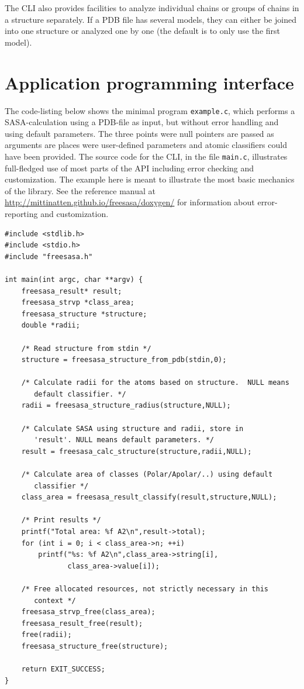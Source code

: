 \documentclass[a4paper,11pt]{article}
\begin{document}
The CLI also provides facilities to analyze individual chains or
groups of chains in a structure separately. If a PDB file has several
models, they can either be joined into one structure or analyzed one
by one (the default is to only use the first model).

\section{Application programming interface}\label{sec:api}

The code-listing below shows the minimal program \verb|example.c|,
which performs a SASA-calculation using a PDB-file as input, but
without error handling and using default parameters. The three points
were null pointers are passed as arguments are places were
user-defined parameters and atomic classifiers could have been
provided. The source code for the CLI, in the file \verb|main.c|,
illustrates full-fledged use of most parts of the API including error
checking and customization. The example here is meant to illustrate
the most basic mechanics of the library. See the reference manual at
\url{http://mittinatten.github.io/freesasa/doxygen/} for information
about error-reporting and customization.

\begin{verbatim}
#include <stdlib.h>
#include <stdio.h>
#include "freesasa.h"

int main(int argc, char **argv) {
    freesasa_result* result;
    freesasa_strvp *class_area;
    freesasa_structure *structure;
    double *radii;

    /* Read structure from stdin */
    structure = freesasa_structure_from_pdb(stdin,0);

    /* Calculate radii for the atoms based on structure.  NULL means
       default classifier. */
    radii = freesasa_structure_radius(structure,NULL);

    /* Calculate SASA using structure and radii, store in
       'result'. NULL means default parameters. */
    result = freesasa_calc_structure(structure,radii,NULL);
    
    /* Calculate area of classes (Polar/Apolar/..) using default
       classifier */
    class_area = freesasa_result_classify(result,structure,NULL);

    /* Print results */
    printf("Total area: %f A2\n",result->total);
    for (int i = 0; i < class_area->n; ++i)
        printf("%s: %f A2\n",class_area->string[i],
               class_area->value[i]);

    /* Free allocated resources, not strictly necessary in this
       context */
    freesasa_strvp_free(class_area);
    freesasa_result_free(result);
    free(radii);
    freesasa_structure_free(structure);

    return EXIT_SUCCESS;
}
\end{verbatim}
\end{document}
